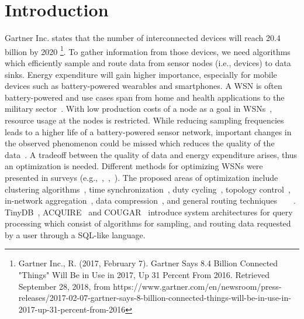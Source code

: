 \section{Introduction}
\label{sec:Introduction}
Gartner Inc. states that the number of interconnected devices will reach 20.4 billion by 2020 \footnote{Gartner Inc., R. (2017, February 7). Gartner Says 8.4 Billion Connected "Things" Will Be in Use in 2017, Up 31 Percent From 2016. Retrieved September 28, 2018, from https://www.gartner.com/en/newsroom/press-releases/2017-02-07-gartner-says-8-billion-connected-things-will-be-in-use-in-2017-up-31-percent-from-2016}.
To gather information from those devices, we need algorithms which efficiently sample and route data from sensor nodes (i.e., devices) to data sinks. Energy expenditure will gain higher importance, especially for mobile devices such as battery-powered wearables and smartphones. A \ac{WSN} is often battery-powered and use cases span from home and health applications to the military sector~\cite{akyildiz2002wireless}. With low production costs of a node as a goal in \acp{WSN}~\cite{akyildiz2002wireless}, resource usage at the nodes is restricted. While reducing sampling frequencies leads to a higher life of a battery-powered sensor network, important changes in the observed phenomenon could be missed which reduces the quality of the data~\cite{akyildiz2002wireless}. A tradeoff between the quality of data and energy expenditure arises, thus an optimization is needed. Different methods for optimizing \acp{WSN} were presented in surveys (e.g.,~\cite{abbasi2007survey},~\cite{sivrikaya2004time},~\cite{carrano2014survey}). The proposed areas of optimization include clustering algorithms~\cite{abbasi2007survey}, time synchronization~\cite{sivrikaya2004time}, duty cycling~\cite{carrano2014survey}, topology control~\cite{li2013survey}, in-network aggregation~\cite{fasolo2007network}, data compression~\cite{srisooksai2012practical}, and general routing techniques~\cite{al2004routing}~\cite{kulkarni2011particle}~\cite{singh2015survey}~\cite{rault2014energy}. TinyDB~\cite{madden2005tinydb}, ACQUIRE~\cite{sadagopan2003acquire} and COUGAR~\cite{yao2002cougar} introduce system architectures for query processing which consist of algorithms for sampling, and routing data requested by a user through a SQL-like language.




